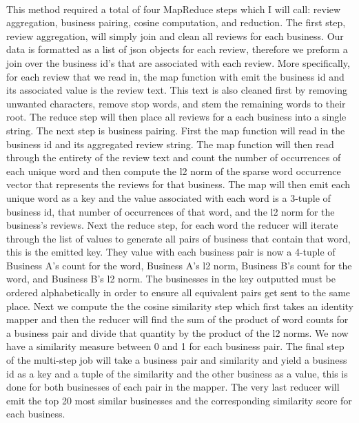 \documentclass[paper=letter, fontsize=15pt]{article} %
\begin{document}
\paragraph{}This method required a total of four MapReduce steps which I will call: review aggregation, business pairing, cosine computation, and reduction. The first step, review aggregation, will simply join and clean all reviews for each business. Our data is formatted as a list of json objects for each review, therefore we preform a join over the business id's that are associated with each review. More specifically, for each review that we read in, the map function with emit the business id and its associated value is the review text. This text is also cleaned first by removing unwanted characters, remove stop words, and stem the remaining words to their root. The reduce step will then place all reviews for a each business into a single string. The next step is business pairing. First the map function will read in the business id and its aggregated review string. The map function will then read through the entirety of the review text and count the number of occurrences of each unique word and then compute the l2 norm of the sparse word occurrence vector that represents the reviews for that business.  The map will then emit each unique word as a key and the value associated with each word is a 3-tuple of business id, that number of occurrences of that word, and the l2 norm for the business's reviews. Next the reduce step, for each word the reducer will iterate through the list of values to generate all pairs of business that contain that word, this is the emitted key. They value with each business pair is now a 4-tuple of Business A's count for the word, Business A's l2 norm, Business B's count for the word, and Business B's l2 norm. The businesses in the key outputted must be ordered alphabetically in order to ensure all equivalent pairs get sent to the same place. Next we compute the the cosine similarity step which first takes an identity mapper and then the reducer will find the sum of the product of word counts for a business pair and divide that quantity by the product of the l2 norms. We now have a similarity measure between 0 and 1 for each business pair. The final step of the multi-step job will take a business pair and similarity and yield a business id as a key and a tuple of the similarity and the other business as a value, this is done for both businesses of each pair in the mapper. The very last reducer will emit the top 20 most similar businesses and the corresponding similarity score for each business. 
\end{document}
